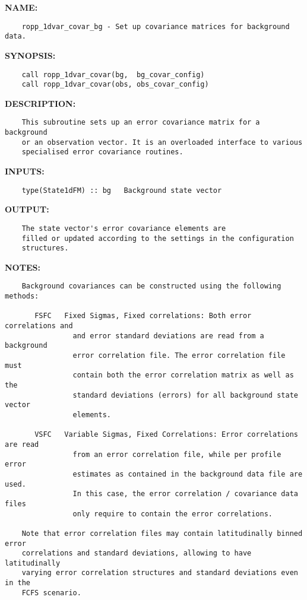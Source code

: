\label{ch:robo13}
\label{ch:Error_covariances_ropp_1dvar_covar_bg}
\textbf{NAME:}\hspace{0.08in}\begin{Verbatim}
    ropp_1dvar_covar_bg - Set up covariance matrices for background data.
\end{Verbatim}
\textbf{SYNOPSIS:}\hspace{0.08in}\begin{Verbatim}
    call ropp_1dvar_covar(bg,  bg_covar_config)
    call ropp_1dvar_covar(obs, obs_covar_config)
\end{Verbatim}
\textbf{DESCRIPTION:}\hspace{0.08in}\begin{Verbatim}
    This subroutine sets up an error covariance matrix for a background
    or an observation vector. It is an overloaded interface to various 
    specialised error covariance routines.
\end{Verbatim}
\textbf{INPUTS:}\hspace{0.08in}\begin{Verbatim}
    type(State1dFM) :: bg   Background state vector
\end{Verbatim}
\textbf{OUTPUT:}\hspace{0.08in}\begin{Verbatim}
    The state vector's error covariance elements are
    filled or updated according to the settings in the configuration
    structures. 
\end{Verbatim}
\textbf{NOTES:}\hspace{0.08in}\begin{Verbatim}
    Background covariances can be constructed using the following methods:

       FSFC   Fixed Sigmas, Fixed correlations: Both error correlations and
                and error standard deviations are read from a background
                error correlation file. The error correlation file must 
                contain both the error correlation matrix as well as the
                standard deviations (errors) for all background state vector
                elements.

       VSFC   Variable Sigmas, Fixed Correlations: Error correlations are read
                from an error correlation file, while per profile error 
                estimates as contained in the background data file are used.
                In this case, the error correlation / covariance data files
                only require to contain the error correlations.

    Note that error correlation files may contain latitudinally binned error
    correlations and standard deviations, allowing to have latitudinally 
    varying error correlation structures and standard deviations even in the 
    FCFS scenario.
\end{Verbatim}
